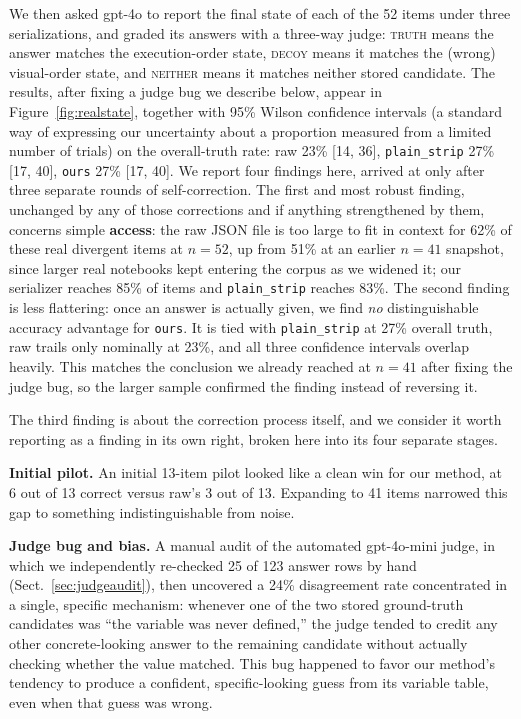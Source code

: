 \documentclass[11pt]{article}
\begin{document}
We then asked gpt-4o to report the final state of each of the 52 items
under three serializations, and graded its answers with a three-way
judge: \textsc{truth} means the answer matches the execution-order state,
\textsc{decoy} means it matches the (wrong) visual-order state, and
\textsc{neither} means it matches neither stored candidate. The results,
after fixing a judge bug we describe below, appear in
Figure~\ref{fig:realstate}, together with 95\% Wilson confidence
intervals (a standard way of expressing our uncertainty about a
proportion measured from a limited number of trials) on the
overall-truth rate: raw 23\% [14, 36], \texttt{plain\_strip} 27\% [17,
40], \texttt{ours} 27\% [17, 40]. We report four findings here, arrived
at only after three separate rounds of self-correction. The first and
most robust finding, unchanged by any of those corrections and if
anything strengthened by them, concerns simple \textbf{access}: the raw
JSON file is too large to fit in context for 62\% of these real
divergent items at $n=52$, up from 51\% at an earlier $n=41$ snapshot,
since larger real notebooks kept entering the corpus as we widened it;
our serializer reaches 85\% of items and \texttt{plain\_strip} reaches
83\%. The second finding is less flattering: once an answer is actually
given, we find \emph{no} distinguishable accuracy advantage for
\texttt{ours}. It is tied with \texttt{plain\_strip} at 27\% overall
truth, raw trails only nominally at 23\%, and all three confidence
intervals overlap heavily. This matches the conclusion we already reached
at $n=41$ after fixing the judge bug, so the larger sample confirmed the
finding instead of reversing it.

The third finding is about the correction process itself, and we
consider it worth reporting as a finding in its own right, broken here
into its four separate stages.

\textbf{Initial pilot.} An initial 13-item pilot looked like a clean win
for our method, at 6 out of 13 correct versus raw's 3 out of 13.
Expanding to 41 items narrowed this gap to something indistinguishable
from noise.

\textbf{Judge bug and bias.} A manual audit of the automated gpt-4o-mini
judge, in which we independently re-checked 25 of 123 answer rows by
hand (Sect.~\ref{sec:judgeaudit}), then uncovered a 24\% disagreement
rate concentrated in a single, specific mechanism: whenever one of the
two stored ground-truth candidates was ``the variable was never
defined,'' the judge tended to credit any other concrete-looking answer
to the remaining candidate without actually checking whether the value
matched. This bug happened to favor our method's tendency to produce a
confident, specific-looking guess from its variable table, even when
that guess was wrong.
\end{document}
